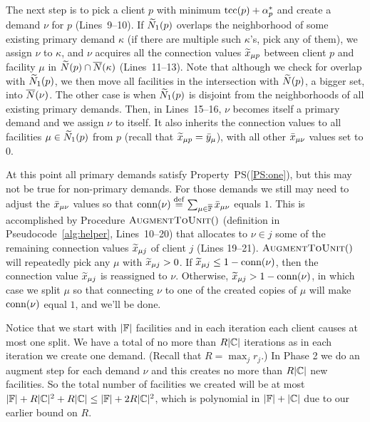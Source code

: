 \documentclass[11pt]{article}
\begin{document}


The next step is to pick a client $p$ with minimum
$\textrm{tcc}(p)+\alpha_p^\ast$ and create a demand $\nu$ for $p$
(Lines~9--10). If ${\widetilde N}_1(p)$ overlaps the neighborhood
of some existing primary demand $\kappa$ (if there are
multiple such $\kappa$'s, pick any of them), we assign $\nu$
to $\kappa$, and $\nu$ acquires all the connection values
${\widetilde x}_{\mu p}$ between client $p$ and facility $\mu$ in
${\widetilde N}(p)\cap {\overline{N}}(\kappa)$ (Lines~11--13). Note that
although we check for overlap with ${\widetilde N}_1(p)$, we then
move all facilities in the intersection with ${\widetilde N}(p)$,
a bigger set, into ${\overline{N}}(\nu)$.  The other case is when
${\widetilde N}_1(p)$ is disjoint from the neighborhoods of all
existing primary demands. Then, in Lines~15--16, $\nu$
becomes itself a primary demand and we assign $\nu$ to
itself. It also inherits the connection values to all
facilities $\mu\in{\widetilde N}_1(p)$ from $p$ (recall that
${\widetilde x}_{\mu p} = {\bar y}_{\mu}$), with all other
${\bar x}_{\mu\nu}$ values set to $0$.

At this point all primary demands satisfy
Property~PS(\ref{PS:one}), but this may not be true for
non-primary demands. For those demands we still may need to
adjust the ${\bar x}_{\mu\nu}$ values so that ${\textrm{conn}}(\nu)
\stackrel{\mathrm{def}}{=}
\sum_{\mu\in\overline{\mathbb{F}}}{\bar x}_{\mu \nu}$ equals $1$. This
is accomplished by Procedure ${\textsc{AugmentToUnit}}()$ (definition
in Pseudocode~\ref{alg:helper}, Lines~10--20) that allocates
to $\nu\in j$ some of the remaining connection values
${\widetilde x}_{\mu j}$ of client $j$ (Lines 19--21).
${\textsc{AugmentToUnit}}()$ will repeatedly pick any $\mu$ with
${\widetilde x}_{\mu j} >0$.  If ${\widetilde x}_{\mu j} \leq
1-{\textrm{conn}}(\nu)$, then the connection value ${\widetilde x}_{\mu
  j}$ is reassigned to $\nu$. Otherwise, ${\widetilde x}_{\mu j} >
1-{\textrm{conn}}(\nu)$, in which case we split $\mu$ so that
connecting $\nu$ to one of the created copies of $\mu$ will
make ${\textrm{conn}}(\nu)$ equal $1$, and we'll be done.

\smallskip

Notice that we start with $|\mathbb{F}|$ facilities and in
each iteration each client causes at most one split. We have
a total of no more than $R|\mathbb{C}|$ iterations as in
each iteration we create one demand. (Recall that $R =
\max_jr_j$.) In Phase 2 we do an augment step for each
demand $\nu$ and this creates no more than $R|\mathbb{C}|$
new facilities.  So the total number of facilities we
created will be at most $|\mathbb{F}|+ R|\mathbb{C}|^2 +
R|\mathbb{C}| \leq |\mathbb{F}| + 2R|\mathbb{C}|^2$, which is
polynomial in $|\mathbb{F}|+|\mathbb{C}|$ due to our earlier
bound on $R$.
\end{document}
